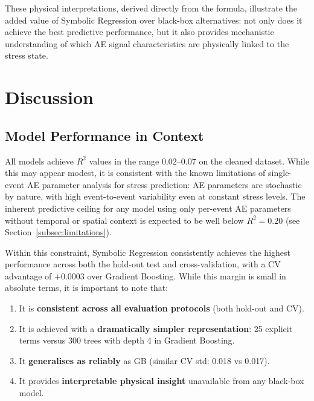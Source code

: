 \documentclass[12pt,a4paper]{article}
\begin{document}
These physical interpretations, derived directly from the formula, illustrate
the added value of Symbolic Regression over black-box alternatives: not only
does it achieve the best predictive performance, but it also provides mechanistic
understanding of which AE signal characteristics are physically linked to the
stress state.

\section{Discussion}
\label{sec:discussion}

\subsection{Model Performance in Context}
\label{subsec:performance_context}

All models achieve $R^{2}$ values in the range $0.02$--$0.07$ on the cleaned
dataset. While this may appear modest, it is consistent with the known
limitations of single-event AE parameter analysis for stress prediction: AE
parameters are stochastic by nature, with high event-to-event variability even
at constant stress levels. The inherent predictive ceiling for any model using
only per-event AE parameters without temporal or spatial context is expected to
be well below $R^{2} = 0.20$ (see Section~\ref{subsec:limitations}).

Within this constraint, Symbolic Regression consistently achieves the highest
performance across both the hold-out test and cross-validation, with a CV
advantage of $+0.0003$ over Gradient Boosting. While this margin is small in
absolute terms, it is important to note that:

\begin{enumerate}
  \item It is \textbf{consistent across all evaluation protocols} (both
        hold-out and CV).
  \item It is achieved with a \textbf{dramatically simpler representation}: 25
        explicit terms versus 300 trees with depth 4 in Gradient Boosting.
  \item It \textbf{generalises as reliably} as GB (similar CV std: 0.018 vs
        0.017).
  \item It provides \textbf{interpretable physical insight} unavailable from any
        black-box model.
\end{enumerate}
\end{document}
